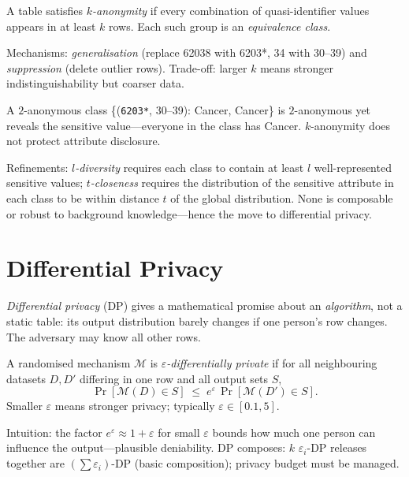 \begin{definition}[$k$-anonymity]
A table satisfies \emph{$k$-anonymity} if every combination of quasi-identifier values appears in at least $k$ rows. Each such group is an \emph{equivalence class}.
\end{definition}
Mechanisms: \emph{generalisation} (replace 62038 with 6203*, 34 with 30--39) and \emph{suppression} (delete outlier rows). Trade-off: larger $k$ means stronger indistinguishability but coarser data.
\begin{example}
A $2$-anonymous class \{(\texttt{6203*}, 30--39): Cancer, Cancer\} is $2$-anonymous yet reveals the sensitive value---everyone in the class has Cancer. $k$-anonymity does not protect attribute disclosure.
\end{example}
Refinements: \emph{$l$-diversity} requires each class to contain at least $l$ well-represented sensitive values; \emph{$t$-closeness} requires the distribution of the sensitive attribute in each class to be within distance $t$ of the global distribution. None is composable or robust to background knowledge---hence the move to differential privacy.
\section{Differential Privacy}
\label{sec:dp}
\emph{Differential privacy} (DP) gives a mathematical promise about an \emph{algorithm}, not a static table: its output distribution barely changes if one person's row changes. The adversary may know all other rows.
\begin{definition}[$\varepsilon$-DP]
A randomised mechanism $\mathcal{M}$ is \emph{$\varepsilon$-differentially private} if for all neighbouring datasets $D,D'$ differing in one row and all output sets $S$,
\[ \Pr[\mathcal{M}(D)\in S] \;\le\; e^{\varepsilon}\,\Pr[\mathcal{M}(D')\in S]. \]
Smaller $\varepsilon$ means stronger privacy; typically $\varepsilon\in[0.1,5]$.
\end{definition}
Intuition: the factor $e^{\varepsilon}\approx1+\varepsilon$ for small $\varepsilon$ bounds how much one person can influence the output---plausible deniability. DP composes: $k$ $\varepsilon_i$-DP releases together are $(\sum\varepsilon_i)$-DP (basic composition); privacy budget must be managed.

